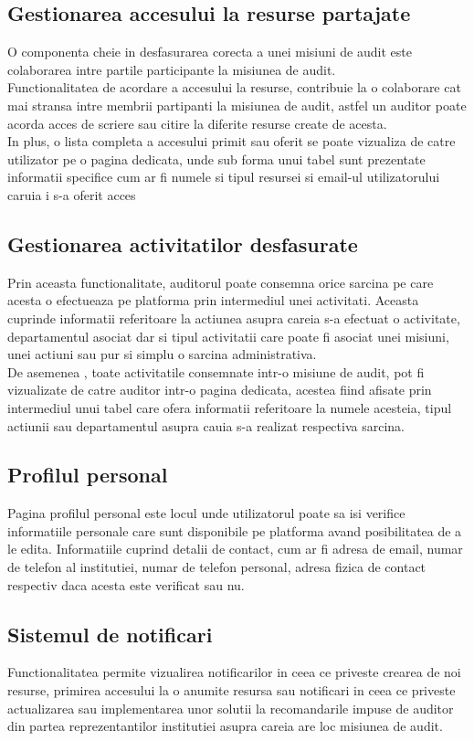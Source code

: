	\subsection{Gestionarea accesului la resurse partajate}
	 O componenta cheie in desfasurarea corecta a unei misiuni de audit este colaborarea intre partile participante la misiunea de audit.\\
		Functionalitatea de acordare a accesului la resurse, contribuie la o colaborare cat mai stransa intre membrii partipanti la misiunea de audit, astfel un auditor poate acorda acces de scriere sau citire la diferite resurse create de acesta.\\
		In plus, o lista completa a accesului primit sau oferit se poate vizualiza de catre utilizator pe o pagina dedicata, unde sub forma unui tabel sunt prezentate informatii specifice cum ar fi numele si tipul resursei si email-ul utilizatorului caruia i s-a oferit  acces
		
	\subsection{Gestionarea activitatilor desfasurate}
	 Prin aceasta functionalitate, auditorul poate consemna orice sarcina pe care acesta o efectueaza pe platforma prin intermediul unei activitati. Aceasta cuprinde informatii referitoare la actiunea asupra careia s-a efectuat o activitate, departamentul asociat dar si tipul activitatii care poate fi asociat unei misiuni, unei actiuni sau pur si simplu o sarcina administrativa.\\
	 De asemenea , toate activitatile consemnate intr-o misiune de audit, pot fi vizualizate de catre auditor intr-o pagina dedicata, acestea fiind afisate prin intermediul unui tabel care ofera informatii referitoare la numele acesteia, tipul actiunii sau departamentul asupra cauia s-a realizat respectiva sarcina.
	 
	
	\subsection{Profilul personal}
	Pagina profilul personal este locul unde utilizatorul poate sa isi verifice informatiile personale care sunt disponibile pe platforma avand posibilitatea de a le edita. Informatiile cuprind detalii de contact, cum ar fi adresa de email, numar de telefon al institutiei, numar de telefon personal, adresa fizica de contact respectiv daca acesta este verificat sau nu.
 
	
	\subsection{Sistemul de notificari}
		Functionalitatea permite vizualirea notificarilor in ceea ce priveste crearea de noi resurse, primirea accesului la o anumite resursa sau notificari in ceea ce priveste actualizarea sau implementarea unor solutii la recomandarile impuse de auditor din partea reprezentantilor institutiei asupra careia are loc misiunea de audit.



